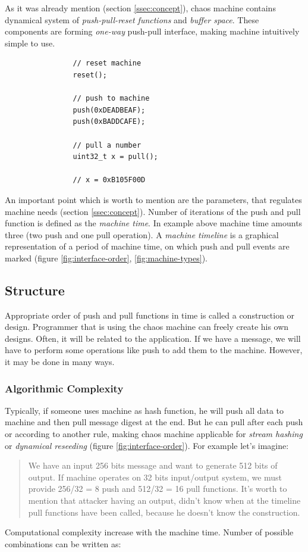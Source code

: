 \documentclass[twocolumn, a4paper, 10pt]{article}
\begin{document}
As it was already mention (section \ref{ssec:concept}), chaos machine contains dynamical system of \textit{push-pull-reset functions} and \textit{buffer space}. These components are forming \textit{one-way} push-pull interface, making machine intuitively simple to use.

\begin{verbatim}
                // reset machine
                reset();

                // push to machine
                push(0xDEADBEAF);
                push(0xBADDCAFE);

                // pull a number
                uint32_t x = pull();

                // x = 0xB105F00D
\end{verbatim}

An important point which is worth to mention are the parameters, that regulates machine needs (section \ref{ssec:concept}). Number of iterations of the push and pull function is defined as the \textit{machine time}. In example above machine time amounts three (two push and one pull operation). A \textit{machine timeline} is a graphical representation of a period of machine time, on which push and pull events are marked (figure \ref{fig:interface-order}, \ref{fig:machine-types}).


\subsection{Structure}

Appropriate order of push and pull functions in time is called a construction or design. Programmer that is using the chaos machine can freely create his own designs. Often, it will be related to the application. If we have a message, we will have to perform some operations like push to add them to the machine. However, it may be done in many ways.

\subsubsection{Algorithmic Complexity}

Typically, if someone uses machine as hash function, he will push all data to machine and then pull message digest at the end. But he can pull after each push or according to another rule, making chaos machine applicable for \textit{stream hashing} or \textit{dynamical reseeding} (figure \ref{fig:interface-order}). For example let's imagine: \blockquote{We have an input 256 bits message and want to generate 512 bits of output. If machine operates on 32 bits input/output system, we must provide 256/32 = 8 push and 512/32 = 16 pull functions. It's worth to mention that attacker having an output, didn't know when at the timeline pull functions have been called, because he doesn't know the construction.} Computational complexity increase with the machine time. Number of possible combinations can be written as:
\end{document}
